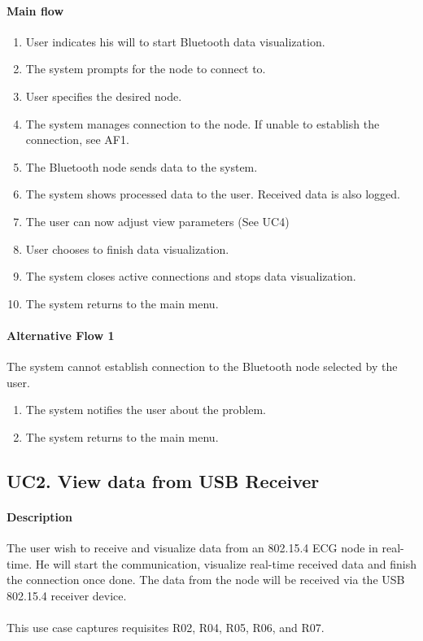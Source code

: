 			\paragraph{Main flow}
				\begin{enumerate}
				\item User indicates his will to start Bluetooth data visualization.
				\item The system prompts for the node to connect to.
				\item User specifies the desired node.
				\item The system manages connection to the node. If unable to establish the connection, see AF1.
				\item The Bluetooth node sends data to the system.
				\item The system shows processed data to the user. Received data is also logged.
				\item The user can now adjust view parameters (See UC4)
				\item User chooses to finish data visualization.
				\item The system closes active connections and stops data visualization.
				\item The system returns to the main menu.
				\end{enumerate}

			\paragraph{Alternative Flow 1} The system cannot establish connection to the Bluetooth node selected by the user.
				\begin{enumerate}
				\item The system notifies the user about the problem.
				\item The system returns to the main menu.
				\end{enumerate}

		\subsection{UC2. View data from USB Receiver}

			\paragraph{Description} The user wish to receive and visualize data from 	an 802.15.4 ECG node in real-time. He will start the communication, visualize real-time received data and finish the connection once done. The data from the node will be received via the USB 802.15.4 receiver device.\\
			\\This use case captures requisites R02, R04, R05, R06, and R07.

